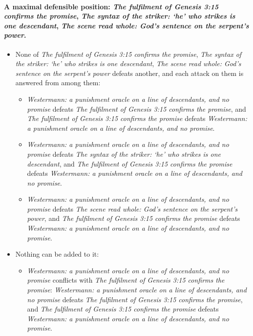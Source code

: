 \documentclass[11pt]{article}
\begin{document}
\paragraph{A maximal defensible position: \emph{The fulfilment of Genesis 3:15 confirms the promise}, \emph{The syntax of the striker: ‘he’ who strikes is one descendant}, \emph{The scene read whole: God’s sentence on the serpent’s power}.}
\begin{itemize}
\item None of \emph{The fulfilment of Genesis 3:15 confirms the promise}, \emph{The syntax of the striker: ‘he’ who strikes is one descendant}, \emph{The scene read whole: God’s sentence on the serpent’s power} defeats another, and each attack on them is answered from among them:
\begin{itemize}
\item \emph{Westermann: a punishment oracle on a line of descendants, and no promise} defeats \emph{The fulfilment of Genesis 3:15 confirms the promise}, and \emph{The fulfilment of Genesis 3:15 confirms the promise} defeats \emph{Westermann: a punishment oracle on a line of descendants, and no promise}.
\item \emph{Westermann: a punishment oracle on a line of descendants, and no promise} defeats \emph{The syntax of the striker: ‘he’ who strikes is one descendant}, and \emph{The fulfilment of Genesis 3:15 confirms the promise} defeats \emph{Westermann: a punishment oracle on a line of descendants, and no promise}.
\item \emph{Westermann: a punishment oracle on a line of descendants, and no promise} defeats \emph{The scene read whole: God’s sentence on the serpent’s power}, and \emph{The fulfilment of Genesis 3:15 confirms the promise} defeats \emph{Westermann: a punishment oracle on a line of descendants, and no promise}.
\end{itemize}
\item Nothing can be added to it:
\begin{itemize}
\item \emph{Westermann: a punishment oracle on a line of descendants, and no promise} conflicts with \emph{The fulfilment of Genesis 3:15 confirms the promise}: \emph{Westermann: a punishment oracle on a line of descendants, and no promise} defeats \emph{The fulfilment of Genesis 3:15 confirms the promise}, and \emph{The fulfilment of Genesis 3:15 confirms the promise} defeats \emph{Westermann: a punishment oracle on a line of descendants, and no promise}.
\end{itemize}
\end{itemize}
\end{document}
